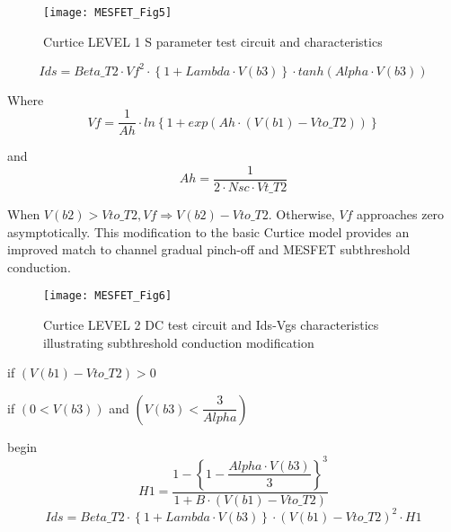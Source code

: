 \begin{figure} 
  \centering
  \texttt{[image: MESFET\_Fig5]}
  \caption{Curtice LEVEL 1 S parameter test circuit and characteristics} 
  \label{fig:fig5}
\end{figure} 

\begin{equation}
 Ids = Beta\_T2 \cdot Vf^{2} \cdot \left\lbrace 1+Lambda \cdot V(b3) \right\rbrace  \cdot tanh(Alpha \cdot V(b3))
\end{equation}  

Where
\begin{equation} Vf = \dfrac{1}{Ah}\cdot ln\left\lbrace 1+exp\left( Ah \cdot (V(b1)-Vto\_T2) \right) \right\rbrace 
 \end{equation} 

and
\begin{equation} Ah = \dfrac{1}{2 \cdot Nsc \cdot Vt\_T2}
 \end{equation}

When $V(b2) > Vto\_T2, Vf \Longrightarrow V(b2) - Vto\_T2$. Otherwise,
$Vf$ approaches zero asymptotically.  This modification to the basic
Curtice model provides an improved match to channel gradual pinch-off
and MESFET subthreshold conduction.

\begin{figure}  
  \centering
  \texttt{[image: MESFET\_Fig6]} 
  \caption{Curtice LEVEL 2 DC test circuit and Ids-Vgs characteristics illustrating subthreshold conduction modification} 
  \label{fig:fig6}
\end{figure} 


if $ (V(b1) - Vto\_T2) > 0$


\hspace{5mm} if $( 0 < V(b3) ) $  and $( V(b3) < \dfrac{3}{Alpha} )$


\hspace{10mm}    begin
		\begin{equation}
 			H1 = \dfrac{1- \left\lbrace 1- \dfrac{Alpha \cdot V(b3)}{3}\right\rbrace ^{3}}{ 1+B \cdot (V(b1)-Vto\_T2) }
		\end{equation}
		\begin{equation}
 		Ids = Beta\_T2 \cdot \left\lbrace 1+Lambda \cdot V(b3) \right\rbrace \cdot  (V(b1)-Vto\_T2)^{2}  \cdot H1 
		\end{equation} 


